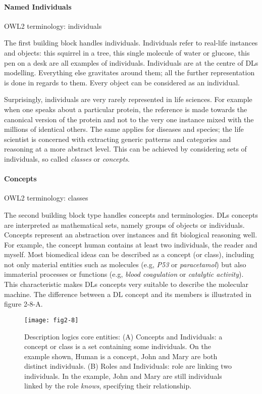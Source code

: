 \paragraph{\textbf{Named Individuals}\\}

OWL2 terminology: individuals

The first building block handles individuals. Individuals refer to real-life instances and objects: this squirrel in a tree, this single molecule of water or glucose, this pen on a desk are all examples of individuals. Individuals are at the centre of DLs modelling. Everything else gravitates around them; all the further representation is done in regards to them. Every object can be considered as an individual.

Surprisingly, individuals are very rarely represented in life sciences. For example when one speaks about a particular protein, the reference is made towards the canonical version of the protein and not to the very one instance mixed with the millions of identical others. The same applies for diseases and species; the life scientist is concerned with extracting generic patterns and categories and reasoning at a more abstract level. This can be achieved by considering sets of individuals, so called \emph{classes} or \emph{concepts}.

\paragraph{\textbf{Concepts}\\}

OWL2 terminology: classes

The second building block type handles concepts and terminologies. DLs concepts are interpreted as mathematical sets, namely groups of objects or individuals. Concepts represent an abstraction over instances and fit biological reasoning well. For example, the concept human contains at least two individuals, the reader and myself. Most biomedical ideas can be described as a concept (or class), including not only material entities such as molecules (e.g, \emph{P53} or \emph{paracetamol}) but also immaterial processes or functions (e.g, \emph{blood coagulation} or \emph{catalytic activity}). This characteristic makes DLs concepts very suitable to describe the molecular machine. The difference between a DL concept and its members is illustrated in figure 2-8-A.

\begin{figure}[ht]
    \centering
    \texttt{[image: fig2-8]}
    \caption{Description logics core entities: (A) Concepts and Individuals: a concept or class is a set containing some individuals. On the example shown, Human is a concept, John and Mary are both distinct individuals. (B) Roles and Individuals: role are linking two individuals. In the example, John and Mary are still individuals linked by the role \emph{knows}, specifying their relationship.}
    \label{fig2-8}
\end{figure}

